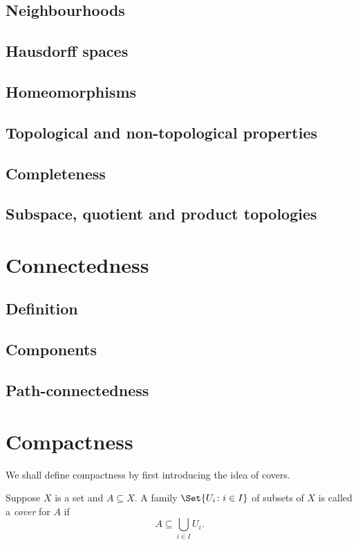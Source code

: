 \documentclass[main.tex]{subfiles}
\begin{document}
	\subsection{Neighbourhoods}
	
	\subsection{Hausdorff spaces}
	
	\subsection{Homeomorphisms}
	
	\subsection{Topological and non-topological properties}
	
	\subsection{Completeness}
	
	\subsection{Subspace, quotient and product topologies}
	
	\section{Connectedness}
	\subsection{Definition}
	
	\subsection{Components}
	
	\subsection{Path-connectedness}
	
	\section{Compactness}
	We shall define compactness by first introducing the idea of covers.
	\begin{definition}
		Suppose $X$ is a set and $A \subseteq X$. A family $\Set{U_i \colon i \in I}$ of subsets of $X$ is called a \textit{cover}  for $A$ if
		\begin{equation*}
			A \subseteq\bigcup_{i \in I} U_i.
		\end{equation*}
	\end{definition}
\end{document}
